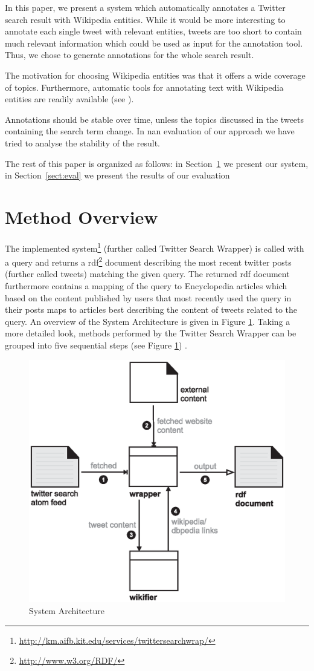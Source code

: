 \documentclass{llncs}
\begin{document}
In this paper, we present a system which automatically annotates a Twitter search result with Wikipedia entities. While it would be more interesting to annotate each single tweet with relevant entities, tweets are too short to contain much relevant information which could be used as input for the annotation tool. Thus, we chose to generate annotations for the whole search result. 

The motivation for choosing Wikipedia entities was that it offers a wide coverage of topics. Furthermore, automatic tools for annotating text with Wikipedia entities are readily available (see \cite{key:wikifier}).

Annotations should be stable over time, unless the topics discussed in the tweets containing the search term change. In nan evaluation of our approach we have tried to analyse the stability of the result.

The rest of this paper is organized as follows: in Section~\ref{sect:method} we present our system, in Section~\ref{sect:eval} we present the results of our evaluation

\section{Method Overview}
\label{sect:method}

The implemented
system\footnote{\url{http://km.aifb.kit.edu/services/twittersearchwrap/}}
(further called Twitter Search Wrapper) is called with a query and returns a
rdf\footnote{\url{http://www.w3.org/RDF/}} document describing the most recent
twitter posts (further called tweets) matching the given query. The returned rdf
document furthermore contains a mapping of the query to Encyclopedia articles
which based on the content published by users that most recently used the query
in their posts maps to articles best describing the content of tweets related to
the query. An overview of the System Architecture is given in Figure
\ref{fig:arch}. Taking a more detailed look, methods performed by the Twitter
Search Wrapper can be grouped into five sequential steps (see Figure
\ref{fig:arch}) .

 
\begin{figure}[htb]
  \centering
  \includegraphics[width=.6\linewidth]{architecture}
  \caption{System Architecture}
  \label{fig:arch}
\end{figure}
\end{document}
